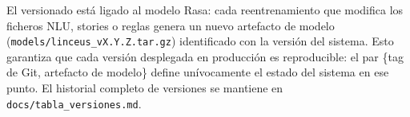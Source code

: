 El versionado está ligado al modelo Rasa: cada reentrenamiento que modifica los ficheros NLU, stories o reglas genera un nuevo artefacto de modelo (\texttt{models/linceus\_vX.Y.Z.tar.gz}) identificado con la versión del sistema. Esto garantiza que cada versión desplegada en producción es reproducible: el par \{tag de Git, artefacto de modelo\} define unívocamente el estado del sistema en ese punto. El historial completo de versiones se mantiene en \texttt{docs/tabla\_versiones.md}.
